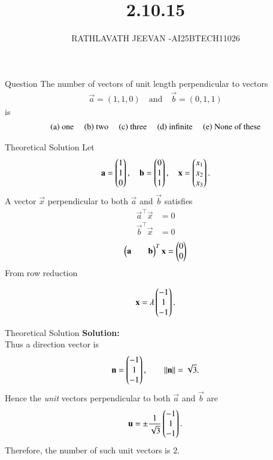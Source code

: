 \documentclass{beamer}
\title %
{2.10.15}
\author %
{RATHLAVATH JEEVAN -AI25BTECH11026}
\begin{document}
\frame{\titlepage}
\begin{frame}{Question}
The number of vectors of unit length perpendicular to vectors 
\begin{align}
\vec{a} = (1,1,0) \quad \text{and} \quad \vec{b} = (0,1,1)
\end{align}
is
\begin{align}
\text{(a) one \quad (b) two \quad (c) three \quad (d) infinite \quad (e) None of these}
\end{align}
\end{frame}
\begin{frame}{Theoretical Solution} 
Let
\begin{align}
\mathbf{a}=\begin{pmatrix}1\\1\\0\end{pmatrix},\quad 
\mathbf{b}=\begin{pmatrix}0\\1\\1\end{pmatrix}, \quad
\mathbf{x}=\begin{pmatrix}x_1\\x_2\\x_3\end{pmatrix}.
\end{align}
A vector $\vec{x}$ perpendicular to both $\vec{a}$ and $\vec{b}$ satisfies
\begin{align}
\vec{a}^\top\vec{x} &= 0 
\label{eq:q1-ax0}\\
\vec{b}^\top\vec{x} &= 0 
\label{eq:q1-bx0}
\end{align}
\begin{align}
    \begin{myvec}{\vec{a} &&\vec{b}}^T\end{myvec}\vec{x}=\begin{myvec}{0\\0}
    \end{myvec}
\end{align}
From row reduction

\begin{align}
\mathbf{x}=\lambda\begin{pmatrix}-1\\1\\-1\end{pmatrix}.
\label{eq:q1-dir}
\end{align}
\end{frame}
\begin{frame}{Theoretical Solution} 
\textbf{Solution:}\\
Thus a direction vector is
\begin{align}
\mathbf{n}=\begin{pmatrix}-1\\1\\-1\end{pmatrix},\qquad 
\|\mathbf{n}\|=\sqrt{3}.
\label{eq:q1-norm}
\end{align}
Hence the \emph{unit} vectors perpendicular to both $\vec{a}$ and $\vec{b}$ are
\begin{align}
\mathbf{u}=\pm\frac{1}{\sqrt{3}}\begin{pmatrix}-1\\1\\-1\end{pmatrix}.
\label{eq:q1-unit}
\end{align}
Therefore, the number of such unit vectors is $\boxed{2}$.
\end{frame}
\end{document}

